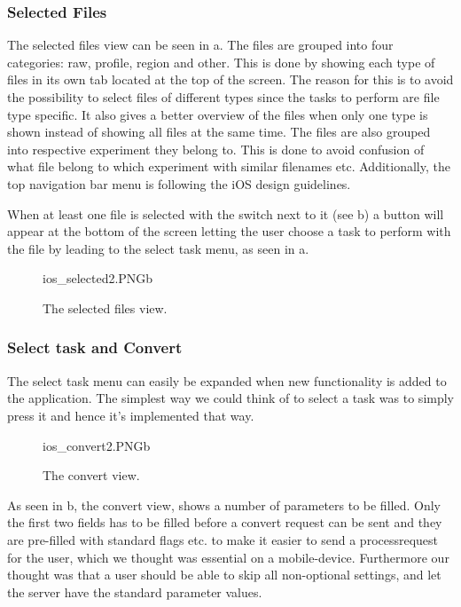 \subsubsection{Selected Files}
The selected files view can be seen in a. The files are grouped into four categories: raw, profile, region and other. This is done by showing each type of files in its own tab located at the top of the screen. The reason for this is to avoid the possibility to select files of different types since the tasks to perform are file type specific. It also gives a better overview of the files when only one type is shown instead of showing all files at the same time. The files are also grouped into respective experiment they belong to. This is done to avoid confusion of what file belong to which experiment with similar filenames etc. Additionally, the top navigation bar menu is following the iOS design guidelines. 

When at least one file is selected with the switch next to it (see b) a button will appear at the bottom of the screen letting the user choose a task to perform with the file by leading to the select task menu, as seen in a.

\begin{figure}[ht]
		{ios_selected2.PNG}{b}
\caption{The selected files view.}
\label{fig:ios_selectedFiles2}
\end{figure}
\FloatBarrier

\subsubsection{Select task and Convert}
The select task menu can easily be expanded when new functionality is added to the application. The simplest way we could think of to select a task was to simply press it and hence it's implemented that way.
\begin{figure}[ht]
		{ios_convert2.PNG}{b}
\caption{The convert view.}
\label{fig:ios_convertParameters}
\end{figure}
\FloatBarrier

As seen in b, the convert view, shows a number of parameters to be filled. Only the first two fields has to be filled before a convert request can be sent and they are pre-filled with standard flags etc. to make it easier to send a processrequest for the user, which we thought was essential on a mobile-device. Furthermore our thought was that a user should be able to skip all non-optional settings, and let the server have the standard parameter values. 


